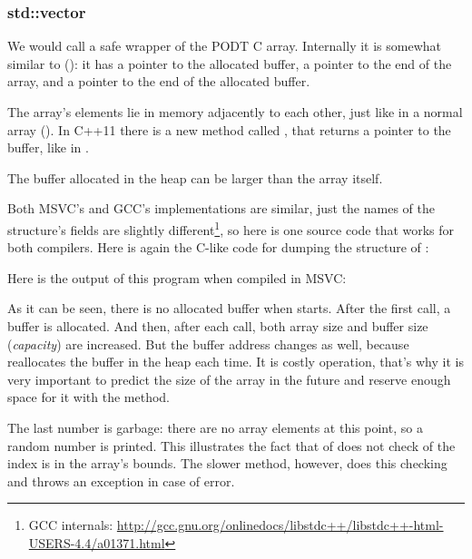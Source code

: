 \subsubsection{std::vector}

We would call  a safe wrapper of the \ac{PODT} C array.
Internally it is somewhat similar to  ():
it has a pointer to the allocated buffer, a pointer to the end of the array, and a pointer to the end of the allocated buffer.

The array's elements  lie in memory adjacently to each other, just like in a normal array ().
In C++11 there is a new method called  , that returns a pointer to the buffer, like  in .

The buffer allocated in the \gls{heap} can be larger than the array itself.

Both MSVC's and GCC's implementations are similar, just the names of the structure's fields are slightly different\footnote
{GCC internals: \url{http://gcc.gnu.org/onlinedocs/libstdc++/libstdc++-html-USERS-4.4/a01371.html}}, so here is one source
code that works for both compilers.
Here is again the C-like code for dumping the structure of :



Here is the output of this program when compiled in MSVC:



As it can be seen, there is no allocated buffer when \main starts.
After the first  call, a buffer is allocated.
And then, after each  
call, both array size and buffer size (\emph{capacity}) are increased.
But the buffer address changes as well, because  
reallocates the buffer in the \gls{heap} each time.
It is costly operation, that's why it is very important to predict the size of the array in the future and reserve 
enough space for it with the  method.

The last number is garbage: there are no array elements at this point, so a random number is printed.
This illustrates the fact that  of 
 does not check of the index is in the array's bounds.
The slower  
method, however, does this checking and throws an  
exception in case of error.

